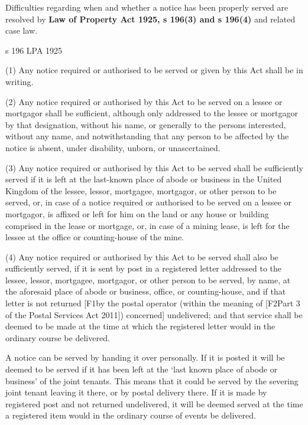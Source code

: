 \documentclass[
]{article}
\newenvironment{env-9843ce55-0506-497d-95ba-03a690b05b3c}
{
    \savenotes\tcolorbox[blanker,breakable,left=5pt,borderline west={2pt}{-4pt}{green}]
}
{
    \endtcolorbox\spewnotes
}
\begin{document}
Difficulties regarding when and whether a notice has been properly
served are resolved by \textbf{Law of Property Act 1925, s 196(3) and s
196(4)} and related case law.

\begin{env-9843ce55-0506-497d-95ba-03a690b05b3c}

s 196 LPA 1925

(1) Any notice required or authorised to be served or given by this Act
shall be in writing.

(2) Any notice required or authorised by this Act to be served on a
lessee or mortgagor shall be sufficient, although only addressed to the
lessee or mortgagor by that designation, without his name, or generally
to the persons interested, without any name, and notwithstanding that
any person to be affected by the notice is absent, under disability,
unborn, or unascertained.

(3) Any notice required or authorised by this Act to be served shall be
sufficiently served if it is left at the last-known place of abode or
business in the United Kingdom of the lessee, lessor, mortgagee,
mortgagor, or other person to be served, or, in case of a notice
required or authorised to be served on a lessee or mortgagor, is affixed
or left for him on the land or any house or building comprised in the
lease or mortgage, or, in case of a mining lease, is left for the lessee
at the office or counting-house of the mine.

(4) Any notice required or authorised by this Act to be served shall
also be sufficiently served, if it is sent by post in a registered
letter addressed to the lessee, lessor, mortgagee, mortgagor, or other
person to be served, by name, at the aforesaid place of abode or
business, office, or counting-house, and if that letter is not returned
{[}F1by the postal operator (within the meaning of {[}F2Part 3 of the
Postal Services Act 2011{]}) concerned{]} undelivered; and that service
shall be deemed to be made at the time at which the registered letter
would in the ordinary course be delivered.

\end{env-9843ce55-0506-497d-95ba-03a690b05b3c}

A notice can be served by handing it over personally. If it is posted it
will be deemed to be served if it has been left at the `last known place
of abode or business' of the joint tenants. This means that it could be
served by the severing joint tenant leaving it there, or by postal
delivery there. If it is made by registered post and not returned
undelivered, it will be deemed served at the time a registered item
would in the ordinary course of events be delivered.
\end{document}
